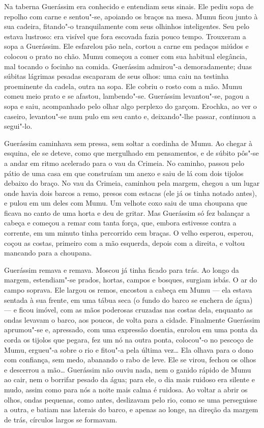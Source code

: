 Na taberna Guerássim era conhecido e entendiam seus sinais. Ele pediu
sopa de repolho com carne e sentou"-se, apoiando os braços na mesa. Mumu
ficou junto à sua cadeira, fitando"-o tranquilamente com seus olhinhos
inteligentes. Seu pelo estava lustroso: era visível que fora escovada
fazia pouco tempo. Trouxeram a sopa a Guerássim. Ele esfarelou pão nela,
cortou a carne em pedaços miúdos e colocou o prato no chão. Mumu começou
a comer com sua habitual elegância, mal tocando o focinho na comida.
Guerássim admirou"-a demoradamente; duas súbitas lágrimas pesadas
escaparam de seus olhos: uma caiu na testinha proeminente da cadela,
outra na sopa. Ele cobriu o rosto com a mão. Mumu comeu meio prato e se
afastou, lambendo"-se. Guerássim levantou"-se, pagou a sopa e saiu,
acompanhado pelo olhar algo perplexo do garçom. Erochka, ao ver o
caseiro, levantou"-se num pulo em seu canto e, deixando"-lhe passar,
continuou a segui"-lo.

Guerássim caminhava sem pressa, sem soltar a cordinha de Mumu. Ao chegar
à esquina, ele se deteve, como que mergulhado em pensamentos, e de
súbito pôs"-se a andar em ritmo acelerado para o vau da Crimeia. No
caminho, passou pelo pátio de uma casa em que construíam um anexo e saiu
de lá com dois tijolos debaixo do braço. No vau da Crimeia, caminhou
pela margem, chegou a um lugar onde havia dois barcos a remo, presos com
estacas (ele já os tinha notado antes), e pulou em um deles com Mumu. Um
velhote coxo saiu de uma choupana que ficava no canto de uma horta e deu
de gritar. Mas Guerássim só fez balançar a cabeça e começou a remar com
tanta força, que, embora estivesse contra a corrente, em um minuto tinha
percorrido cem braças. O velho esperou, esperou, coçou as costas,
primeiro com a mão esquerda, depois com a direita, e voltou mancando
para a choupana.

Guerássim remava e remava. Moscou já tinha ficado para trás. Ao longo da
margem, estendiam"-se prados, hortas, campos e bosques, surgiam isbás. O
ar do campo soprava. Ele largou os remos, encostou a cabeça em Mumu ---
ela estava sentada à sua frente, em uma tábua seca (o fundo do barco se
enchera de água) --- e ficou imóvel, com as mãos poderosas cruzadas nas
costas dela, enquanto as ondas levavam o barco, aos poucos, de volta
para a cidade. Finalmente Guerássim aprumou"-se e, apressado, com uma
expressão doentia, enrolou em uma ponta da corda os tijolos que pegara,
fez um nó na outra ponta, colocou"-o no pescoço de Mumu, ergueu"-a sobre o
rio e fitou"-a pela última vez\ldots{} Ela olhava para o dono com confiança,
sem medo, abanando o rabo de leve. Ele se virou, fechou os olhos e
descerrou a mão\ldots{} Guerássim não ouviu nada, nem o ganido rápido de Mumu
ao cair, nem o borrifar pesado da água; para ele, o dia mais ruidoso era
silente e mudo, assim como para nós a noite mais calma é ruidosa. Ao
voltar a abrir os olhos, ondas pequenas, como antes, deslizavam pelo
rio, como se uma perseguisse a outra, e batiam nas laterais do barco, e
apenas ao longe, na direção da margem de trás, círculos largos se
formavam.

